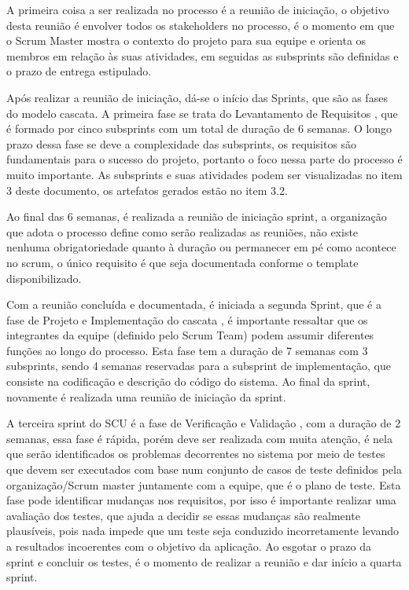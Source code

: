 \documentclass[	DIV=calc,%
							paper=a4,%
							fontsize=12pt,%
							onecolumn]{scrartcl}%
\begin{document}
A primeira coisa a ser realizada no processo é a reunião de iniciação, o objetivo desta reunião é envolver todos os stakeholders no processo, é o momento em que o Scrum Master mostra o contexto do projeto para sua equipe e orienta os membros em relação às suas atividades, em seguidas as subsprints são definidas e o prazo de entrega estipulado.

Após realizar a reunião de iniciação, dá-se o início das Sprints, que são as fases do modelo cascata. A primeira fase se trata do Levantamento de Requisitos \cite{sommervilleengenharia}, que é formado por cinco subsprints com um total de duração de 6 semanas. O longo prazo dessa fase se deve a complexidade das subsprints, os requisitos são fundamentais para o sucesso do projeto, portanto o foco nessa parte do processo é muito importante. As subsprints e suas atividades podem ser visualizadas no item 3 deste documento, os artefatos gerados estão no item 3.2.

Ao final das 6 semanas, é realizada a reunião de iniciação sprint, a organização que adota o processo define como serão realizadas as reuniões, não existe nenhuma obrigatoriedade quanto à duração ou permanecer em pé como acontece no scrum, o único requisito é que seja documentada conforme o template disponibilizado.

Com a reunião concluída e documentada, é iniciada a segunda Sprint, que é a fase de Projeto e Implementação do cascata \cite{sommervilleengenharia}, é importante ressaltar que os integrantes da equipe (definido pelo Scrum Team) podem assumir diferentes funções ao longo do processo. Esta fase tem a duração de 7 semanas com 3 subsprints, sendo 4 semanas reservadas para a subsprint de implementação, que consiste na codificação e descrição do código do sistema. Ao final da sprint, novamente é realizada uma reunião de iniciação da sprint.

A terceira sprint do SCU é a fase de Verificação e Validação , com a duração de 2 semanas, essa fase é rápida, porém deve ser realizada com muita atenção, é nela que serão identificados os problemas decorrentes no sistema por meio de testes que devem ser executados com base num conjunto de casos de teste definidos pela organização/Scrum master juntamente com a equipe, que é o plano de teste. Esta fase pode identificar mudanças nos requisitos, por isso é importante realizar uma avaliação dos testes, que ajuda a decidir se essas mudanças são realmente plausíveis, pois nada impede que um teste seja conduzido incorretamente levando a resultados incoerentes com o objetivo da aplicação. Ao esgotar o prazo da sprint e concluir os testes, é o momento de realizar a reunião e dar início a quarta sprint.
\end{document}
